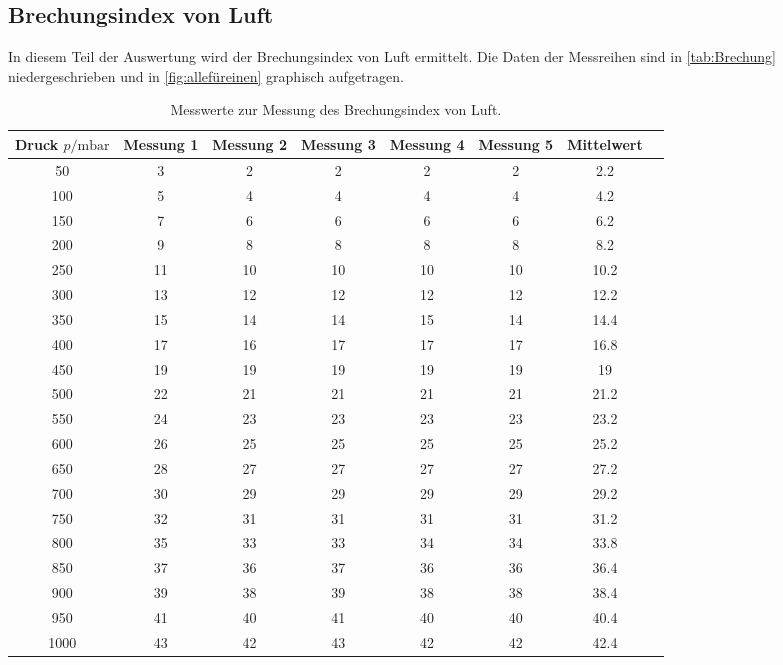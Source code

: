 \subsection{Brechungsindex von Luft}
\label{sec:AusLuft}
In diesem Teil der Auswertung wird der Brechungsindex von Luft ermittelt. Die Daten der Messreihen sind in \autoref{tab:Brechung} niedergeschrieben und in \autoref{fig:allefüreinen} graphisch aufgetragen.
\begin{table}
    \centering
    \caption{Messwerte zur Messung des Brechungsindex von Luft.}
\begin{tabular}{c c c c c c c c }
    \toprule
    Druck $p \mathrm{/} \unit{\milli \bar}$ & Messung 1& Messung 2& Messung 3& Messung 4& Messung 5& Mittelwert \\
    \midrule
                           50& 3& 2& 2& 2& 2& 2.2 \\
                          100& 5& 4& 4& 4& 4& 4.2 \\
                          150& 7& 6& 6& 6& 6& 6.2 \\
                          200& 9& 8& 8& 8& 8& 8.2 \\
                    250& 11& 10& 10& 10& 10& 10.2 \\
                    300& 13& 12& 12& 12& 12& 12.2 \\
                    350& 15& 14& 14& 15& 14& 14.4 \\
                    400& 17& 16& 17& 17& 17& 16.8 \\
                      450& 19& 19& 19& 19& 19& 19 \\
                    500& 22& 21& 21& 21& 21& 21.2 \\
                    550& 24& 23& 23& 23& 23& 23.2 \\
                    600& 26& 25& 25& 25& 25& 25.2&  \\
                    650& 28& 27& 27& 27& 27& 27.2 \\
                    700& 30& 29& 29& 29& 29& 29.2 \\
                    750& 32& 31& 31& 31& 31& 31.2 \\
                    800& 35& 33& 33& 34& 34& 33.8 \\
                    850& 37& 36& 37& 36& 36& 36.4 \\
                    900& 39& 38& 39& 38& 38& 38.4 \\
                    950& 41& 40& 41& 40& 40& 40.4 \\
                   1000& 43& 42& 43& 42& 42& 42.4 \\
    \bottomrule
    \end{tabular}
    \label{tab:Brechung}
\end{table}

